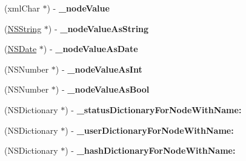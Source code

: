 \begin{DoxyCompactItemize}
\item 
\hypertarget{interface_m_g_twitter_lib_x_m_l_parser_a2f58b5a732f5380f2eea2810271546f3}{
(xml\-Char $\ast$) -\/ {\bfseries \-\_\-node\-Value}}
\label{interface_m_g_twitter_lib_x_m_l_parser_a2f58b5a732f5380f2eea2810271546f3}

\item 
\hypertarget{interface_m_g_twitter_lib_x_m_l_parser_abbf55407236cb146e6bce1ca1b664072}{
(\hyperlink{class_n_s_string}{\-N\-S\-String} $\ast$) -\/ {\bfseries \-\_\-node\-Value\-As\-String}}
\label{interface_m_g_twitter_lib_x_m_l_parser_abbf55407236cb146e6bce1ca1b664072}

\item 
\hypertarget{interface_m_g_twitter_lib_x_m_l_parser_af936b9cc2cde33e169ed960f44ecc21a}{
(\hyperlink{class_n_s_date}{\-N\-S\-Date} $\ast$) -\/ {\bfseries \-\_\-node\-Value\-As\-Date}}
\label{interface_m_g_twitter_lib_x_m_l_parser_af936b9cc2cde33e169ed960f44ecc21a}

\item 
\hypertarget{interface_m_g_twitter_lib_x_m_l_parser_ab6aff756b11021887c06ef5d4b38421d}{
(\-N\-S\-Number $\ast$) -\/ {\bfseries \-\_\-node\-Value\-As\-Int}}
\label{interface_m_g_twitter_lib_x_m_l_parser_ab6aff756b11021887c06ef5d4b38421d}

\item 
\hypertarget{interface_m_g_twitter_lib_x_m_l_parser_a2e5c6df853ae2739331a30e5b36ae274}{
(\-N\-S\-Number $\ast$) -\/ {\bfseries \-\_\-node\-Value\-As\-Bool}}
\label{interface_m_g_twitter_lib_x_m_l_parser_a2e5c6df853ae2739331a30e5b36ae274}

\item 
\hypertarget{interface_m_g_twitter_lib_x_m_l_parser_aa84aae44373ad61c1f85e4a29efe079b}{
(\-N\-S\-Dictionary $\ast$) -\/ {\bfseries \-\_\-status\-Dictionary\-For\-Node\-With\-Name\-:}}
\label{interface_m_g_twitter_lib_x_m_l_parser_aa84aae44373ad61c1f85e4a29efe079b}

\item 
\hypertarget{interface_m_g_twitter_lib_x_m_l_parser_a3595d2b416e47f39ef9098724a8319cf}{
(\-N\-S\-Dictionary $\ast$) -\/ {\bfseries \-\_\-user\-Dictionary\-For\-Node\-With\-Name\-:}}
\label{interface_m_g_twitter_lib_x_m_l_parser_a3595d2b416e47f39ef9098724a8319cf}

\item 
\hypertarget{interface_m_g_twitter_lib_x_m_l_parser_aff1cbb6ad4febd7695040edf4e65d263}{
(\-N\-S\-Dictionary $\ast$) -\/ {\bfseries \-\_\-hash\-Dictionary\-For\-Node\-With\-Name\-:}}
\label{interface_m_g_twitter_lib_x_m_l_parser_aff1cbb6ad4febd7695040edf4e65d263}


\end{DoxyCompactItemize}
